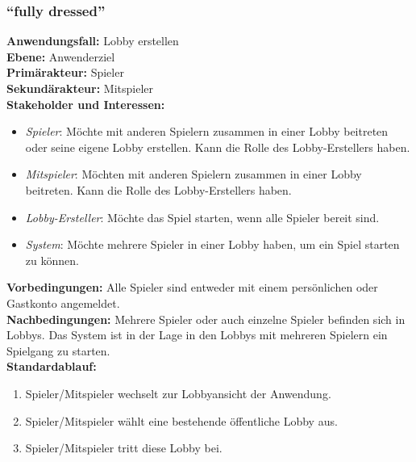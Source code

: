 \documentclass[11pt,ngerman]{article}
\newcommand{\quotes}[1]{``#1''}
\begin{document}
        \subsubsection{\quotes{fully dressed}}
            \begin{tcolorbox}[breakable,sharp corners,colback=white,colframe=gray,width=\dimexpr\textwidth-15mm\relax,enlarge left by=10mm,fontupper=\linespread{1.1}\selectfont]

                \textbf{Anwendungsfall:} Lobby erstellen \\
                \textbf{Ebene:} Anwenderziel \\
                \textbf{Primärakteur:} Spieler \\
                \textbf{Sekundärakteur:} Mitspieler \\
                \textbf{Stakeholder und Interessen:}
                \begin{itemize}
                    \item \textit{Spieler}: Möchte mit anderen Spielern zusammen in einer Lobby beitreten oder seine eigene Lobby erstellen. Kann die Rolle des Lobby-Erstellers haben.
                    \item \textit{Mitspieler}: Möchten mit anderen Spielern zusammen in einer Lobby beitreten. Kann die Rolle des Lobby-Erstellers haben.
                    \item \textit{Lobby-Ersteller}:  Möchte das Spiel starten, wenn alle Spieler bereit sind.
                    \item \textit{System}: Möchte mehrere Spieler in einer Lobby haben, um ein Spiel starten zu können.
                \end{itemize}
                \textbf{Vorbedingungen:} Alle Spieler sind entweder mit einem persönlichen oder Gastkonto angemeldet.\\
                \textbf{Nachbedingungen:} Mehrere Spieler oder auch einzelne Spieler befinden sich in Lobbys. Das System ist in der Lage in den Lobbys mit mehreren Spielern ein Spielgang zu starten. \\
                \textbf{Standardablauf:}
                \begin{enumerate}
                    \item Spieler/Mitspieler wechselt zur Lobbyansicht der Anwendung.
                    \item Spieler/Mitspieler wählt eine bestehende öffentliche Lobby aus.
                    \item Spieler/Mitspieler tritt diese Lobby bei.

\end{enumerate}
\end{tcolorbox}
\end{document}
